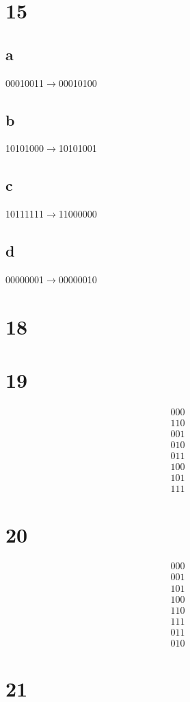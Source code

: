 \documentclass{article}
\begin{document}
\section*{15}
\subsection*{a}
00010011$\to$00010100
\subsection*{b}
10101000$\to$10101001
\subsection*{c}
10111111$\to$11000000
\subsection*{d}
00000001$\to$00000010
\section*{18}
\section*{19}
\begin{align*}
  000\\
  110\\
  001\\
  010\\
  011\\
  100\\
  101\\
  111
\end{align*}
\section*{20}
\begin{align*}
  000\\
  001\\
  101\\
  100\\
  110\\
  111\\
  011\\
  010
\end{align*}
\section*{21}
\end{document}
